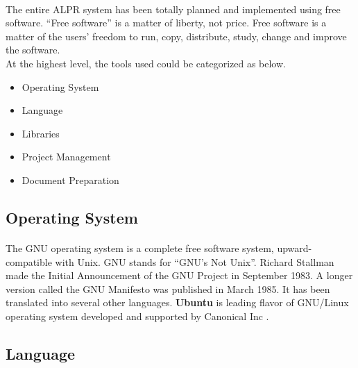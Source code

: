 \documentclass[a4paper,10pt]{iesreport}
\begin{document}
\paragraph*{}
The entire ALPR system has been totally planned and implemented using free software. 
“Free software” is a matter of liberty, not price. Free software is a matter of the users' freedom to run, copy, distribute, study, change and improve the software. \\

At the highest level, the tools used could be 
categorized as below.
\begin{itemize}
 \item Operating System
 \item Language
 \item Libraries
 \item Project Management
 \item Document Preparation
\end{itemize}
\subsection{Operating System}
\paragraph*{}
The GNU \cite{GN} operating system is a complete free software system, upward-compatible with Unix. GNU stands for “GNU's Not Unix”. Richard Stallman made the Initial Announcement of the GNU Project in September 1983. A longer version called the GNU Manifesto was published in March 1985. It has been translated into several other languages.
\textbf{Ubuntu} is leading flavor of GNU/Linux operating system developed and supported by Canonical Inc \cite{UB}.
\subsection{Language}
\end{document}
